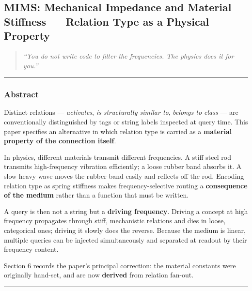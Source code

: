 \documentclass[
  11pt,
  a4paper,
]{article}
\begin{document}
\newpage

\subsection{MIMS: Mechanical Impedance and Material Stiffness ---
Relation Type as a Physical
Property}\label{mims-mechanical-impedance-and-material-stiffness-relation-type-as-a-physical-property}

\begin{quote}
\emph{``You do not write code to filter the frequencies. The physics
does it for you.''}
\end{quote}

\begin{center}\rule{0.5\linewidth}{0.5pt}\end{center}

\subsubsection{Abstract}\label{abstract-2}

Distinct relations --- \emph{activates}, \emph{is structurally similar
to}, \emph{belongs to class} --- are conventionally distinguished by
tags or string labels inspected at query time. This paper specifies an
alternative in which relation type is carried as a \textbf{material
property of the connection itself}.

In physics, different materials transmit different frequencies. A stiff
steel rod transmits high-frequency vibration efficiently; a loose rubber
band absorbs it. A slow heavy wave moves the rubber band easily and
reflects off the rod. Encoding relation type as spring stiffness makes
frequency-selective routing a \textbf{consequence of the medium} rather
than a function that must be written.

A query is then not a string but a \textbf{driving frequency}. Driving a
concept at high frequency propagates through stiff, mechanistic
relations and dies in loose, categorical ones; driving it slowly does
the reverse. Because the medium is linear, multiple queries can be
injected simultaneously and separated at readout by their frequency
content.

Section 6 records the paper's principal correction: the material
constants were originally hand-set, and are now \textbf{derived} from
relation fan-out.

\begin{center}\rule{0.5\linewidth}{0.5pt}\end{center}
\end{document}
